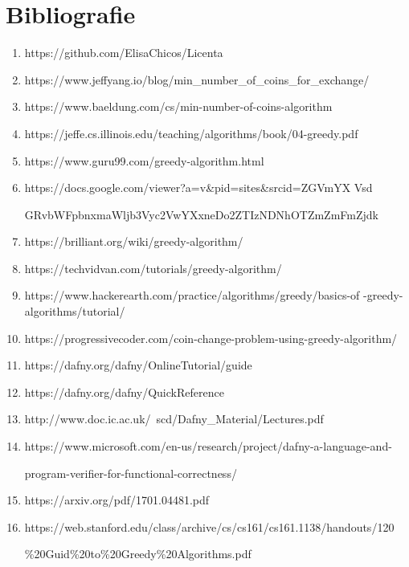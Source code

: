 \chapter*{Bibliografie} 

\begin{enumerate}
	\item https://github.com/ElisaChicos/Licenta
    \item https://www.jeffyang.io/blog/min\_number\_of\_coins\_for\_exchange/
    \item https://www.baeldung.com/cs/min-number-of-coins-algorithm
    \item https://jeffe.cs.illinois.edu/teaching/algorithms/book/04-greedy.pdf
    \item https://www.guru99.com/greedy-algorithm.html
    \item https://docs.google.com/viewer?a=v\&pid=sites\&srcid=ZGVmYX Vsd \par GRvbWFpbnxmaWljb3Vyc2VwYXxneDo2ZTIzNDNhOTZmZmFmZjdk
    \item https://brilliant.org/wiki/greedy-algorithm/
    \item https://techvidvan.com/tutorials/greedy-algorithm/
    \item https://www.hackerearth.com/practice/algorithms/greedy/basics-of -greedy-algorithms/tutorial/
    \item https://progressivecoder.com/coin-change-problem-using-greedy-algorithm/
    \item https://dafny.org/dafny/OnlineTutorial/guide
    \item https://dafny.org/dafny/QuickReference
    \item http://www.doc.ic.ac.uk/~scd/Dafny\_Material/Lectures.pdf
    \item https://www.microsoft.com/en-us/research/project/dafny-a-language-and-\par program-verifier-for-functional-correctness/
    \item https://arxiv.org/pdf/1701.04481.pdf
    \item https://web.stanford.edu/class/archive/cs/cs161/cs161.1138/handouts/120 \par \%20Guid\%20to\%20Greedy\%20Algorithms.pdf

\end{enumerate}